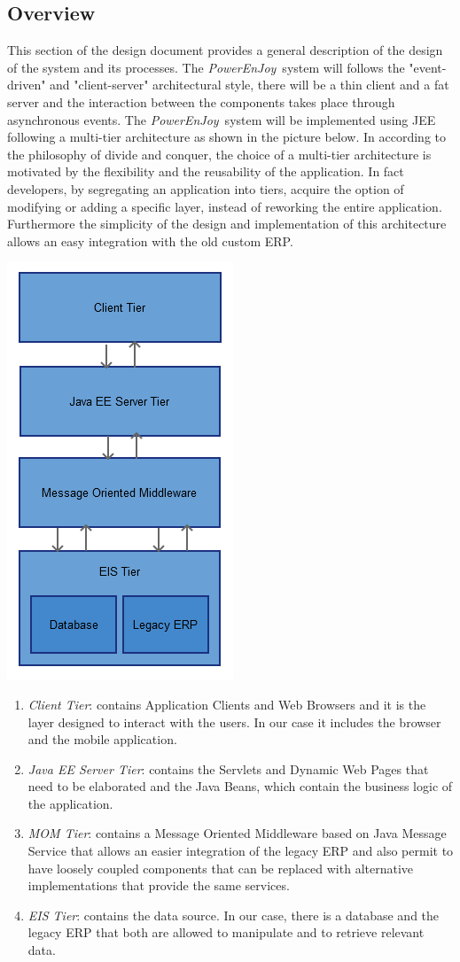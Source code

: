 \documentclass{article}
\newcommand{\pej}{\mbox{\normalfont\itshape PowerEnJoy }}
\begin{document}
		\subsection{Overview}
		This section of the design document provides a general description of the design of the system
		and its processes. The \pej system will follows the "event-driven" and "client-server" architectural style, there will be a thin client and a fat server and the interaction between the components takes place through asynchronous events. The \pej system will be implemented using JEE following a multi-tier architecture as shown in the picture below. In according to the philosophy of divide and conquer, the choice of a multi-tier architecture is motivated by the flexibility and the reusability of the application. In fact developers, by segregating an application into tiers, acquire the option of modifying or adding a specific layer, instead of reworking the entire application. Furthermore the simplicity of the design and implementation of this architecture allows an easy integration with the old custom ERP.
		\begin{center}
			\includegraphics[width=0.3\linewidth]{"img/architecture"}
		\end{center}
		\begin{enumerate}
			\item \textit{Client Tier}: contains Application Clients and Web Browsers and it is the layer designed to interact with the users. In our case it includes the browser and the mobile application.
			\item \textit{Java EE Server Tier}: contains the Servlets and Dynamic Web Pages that need to be elaborated and the Java Beans, which contain the business logic of the application.
			\item \textit{MOM Tier}: contains a Message Oriented Middleware based on Java Message Service that allows an easier integration of the legacy ERP and also permit to have loosely coupled components that can be replaced with alternative implementations that provide the same services.
			\item \textit{EIS Tier}: contains the data source. In our case, there is a database and the legacy ERP that both are allowed to manipulate and to retrieve relevant data.
		\end{enumerate}
		\pagebreak
		
\end{document}
